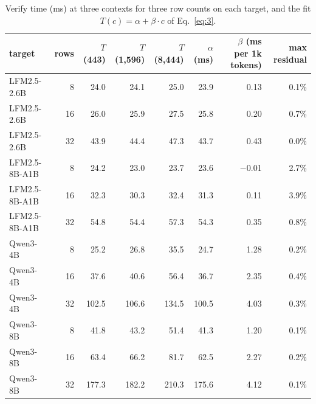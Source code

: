 \begin{table}[t]
\centering\small
\caption{Verify time (ms) at three contexts for three row counts on each target, and the fit $T(c) = \alpha + \beta\cdot c$ of Eq.~\eqref{eq:3}.}
\label{tab:context-law}
\setlength{\tabcolsep}{4pt}
\begin{tabular}{lrrrrrrr}
\toprule
\rowcolor{head}\textbf{target} & \textbf{rows} & \textbf{$T$(443)} & \textbf{$T$(1,596)} & \textbf{$T$(8,444)} & \textbf{$\alpha$ (ms)} & \textbf{$\beta$ (ms per 1k tokens)} & \textbf{max residual} \\
\midrule
LFM2.5-2.6B & 8 & 24.0 & 24.1 & 25.0 & 23.9 & 0.13 & 0.1\% \\
LFM2.5-2.6B & 16 & 26.0 & 25.9 & 27.5 & 25.8 & 0.20 & 0.7\% \\
LFM2.5-2.6B & 32 & 43.9 & 44.4 & 47.3 & 43.7 & 0.43 & 0.0\% \\
LFM2.5-8B-A1B & 8 & 24.2 & 23.0 & 23.7 & 23.6 & $-$0.01 & 2.7\% \\
LFM2.5-8B-A1B & 16 & 32.3 & 30.3 & 32.4 & 31.3 & 0.11 & 3.9\% \\
LFM2.5-8B-A1B & 32 & 54.8 & 54.4 & 57.3 & 54.3 & 0.35 & 0.8\% \\
Qwen3-4B & 8 & 25.2 & 26.8 & 35.5 & 24.7 & 1.28 & 0.2\% \\
Qwen3-4B & 16 & 37.6 & 40.6 & 56.4 & 36.7 & 2.35 & 0.4\% \\
Qwen3-4B & 32 & 102.5 & 106.6 & 134.5 & 100.5 & 4.03 & 0.3\% \\
Qwen3-8B & 8 & 41.8 & 43.2 & 51.4 & 41.3 & 1.20 & 0.1\% \\
Qwen3-8B & 16 & 63.4 & 66.2 & 81.7 & 62.5 & 2.27 & 0.2\% \\
Qwen3-8B & 32 & 177.3 & 182.2 & 210.3 & 175.6 & 4.12 & 0.1\% \\
\bottomrule
\end{tabular}
\end{table}
